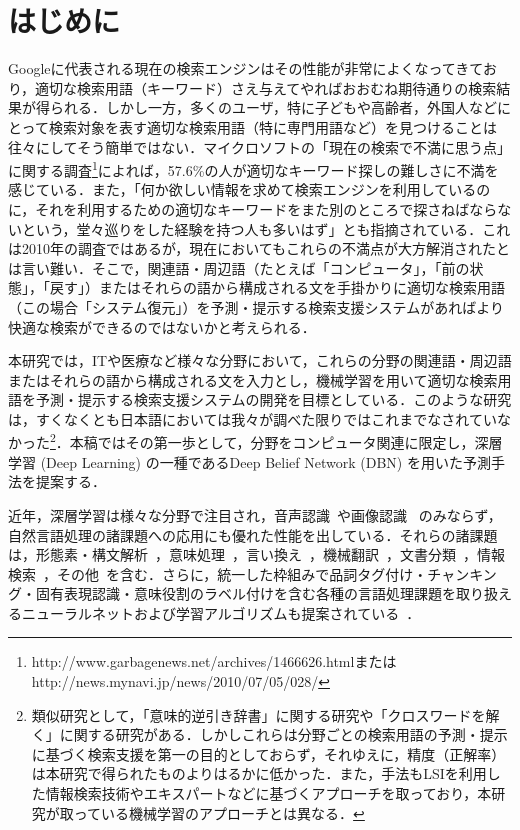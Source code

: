 \documentclass[japanese]{jnlp_1.4}
\begin{document}
\maketitle


\section{はじめに}

Googleに代表される現在の検索エンジンはその性能が非常によくなってきており，適切な検索用語（キーワード）さえ与えてやればおおむね期待通りの検索結果が得られる．しかし一方，多くのユーザ，特に子どもや高齢者，外国人などにとって検索対象を表す適切な検索用語（特に専門用語など）を見つけることは往々にしてそう簡単ではない．マイクロソフトの「現在の検索で不満に思う点」に関する調査\footnote{http://www.garbagenews.net/archives/1466626.htmlまたは http://news.mynavi.jp/news/2010/07/05/028/}によれば，57.6\%の人が適切なキーワード探しの難しさに不満を感じている．また，「何か欲しい情報を求めて検索エンジンを利用しているのに，それを利用するための適切なキーワードをまた別のところで探さねばならないという，堂々巡りをした経験を持つ人も多いはず」とも指摘されている．これは2010年の調査ではあるが，現在においてもこれらの不満点が大方解消されたとは言い難い．そこで，関連語・周辺語（たとえば「コンピュータ」，「前の状態」，「戻す」）またはそれらの語から構成される文を手掛かりに適切な検索用語（この場合「システム復元」）を予測・提示する検索支援システムがあればより快適な検索ができるのではないかと考えられる．

本研究では，ITや医療など様々な分野において，これらの分野の関連語・周辺語またはそれらの語から構成される文を入力とし，機械学習を用いて適切な検索用語を予測・提示する検索支援システムの開発を目標としている．このような研究は，すくなくとも日本語においては我々が調べた限りではこれまでなされていなかった\footnote{類似研究として，「意味的逆引き辞書」に関する研究\cite{Aihara}や「クロスワードを解く」に関する研究\cite{Uchiki}がある．しかしこれらは分野ごとの検索用語の予測・提示に基づく検索支援を第一の目的としておらず，それゆえに，精度（正解率）は本研究で得られたものよりはるかに低かった．また，手法もLSIを利用した情報検索技術やエキスパートなどに基づくアプローチを取っており，本研究が取っている機械学習のアプローチとは異なる．}．本稿ではその第一歩として，分野をコンピュータ関連に限定し，深層学習 (Deep Learning) の一種であるDeep Belief Network (DBN) を用いた予測手法を提案する．

近年，深層学習は様々な分野で注目され，音声認識~\cite{Li}や画像認識~\cite{Krizhevsky} のみならず，自然言語処理の諸課題への応用にも優れた性能を出している．それらの諸課題は，形態素・構文解析~\cite{Billingsley,Hermann,Luong,Socher:13a}，意味処理~\cite{Hashimoto,Srivastava,Tsubaki}，言い換え~\cite{Socher:11}，機械翻訳~\cite{Auli,Liu,Kalchbrenner,Zou}，文書分類~\cite{Glorot}，情報検索~\cite{Salakhutdinov}，その他~\cite{Seide,Socher:13b}を含む．さらに，統一した枠組みで品詞タグ付け・チャンキング・固有表現認識・意味役割のラベル付けを含む各種の言語処理課題を取り扱えるニューラルネットおよび学習アルゴリズムも提案されている~\cite{Collobert}．
\end{document}
